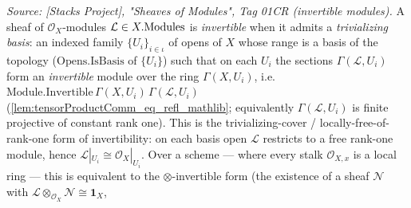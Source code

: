 \begin{definition}

  \label{def:isInvertible}
  \textit{Source: [Stacks Project], "Sheaves of Modules", Tag 01CR (invertible
  modules).}
  A sheaf of \(\mathcal{O}_X\)-modules \(\mathcal{L} \in X.\mathrm{Modules}\) is
  \emph{invertible} when it admits a \emph{trivializing basis}: an indexed family
  \(\{U_i\}_{i \in \iota}\) of opens of \(X\) whose range is a basis of the
  topology (\(\mathrm{Opens.IsBasis}\) of \(\{U_i\}\)) such that on each \(U_i\)
  the sections \(\Gamma(\mathcal{L}, U_i)\) form an \emph{invertible} module over
  the ring \(\Gamma(X, U_i)\), i.e.
  \(\mathrm{Module.Invertible}\,\Gamma(X,U_i)\,\Gamma(\mathcal{L},U_i)\)
  (\cref{lem:tensorProductComm_eq_refl_mathlib}; equivalently
  \(\Gamma(\mathcal{L},U_i)\) is finite projective of constant rank one). This is
  the trivializing-cover / locally-free-of-rank-one form of invertibility: on each
  basis open \(\mathcal{L}\) restricts to a free rank-one module, hence
  \(\mathcal{L}|_{U_i} \cong \mathcal{O}_X|_{U_i}\). Over a scheme --- where every
  stalk \(\mathcal{O}_{X,x}\) is a local ring --- this is equivalent to the
  \(\otimes\)-invertible form (the existence of a sheaf \(\mathcal{N}\) with
  \(\mathcal{L} \otimes_{\mathcal{O}_X} \mathcal{N} \cong \mathbf{1}_X\),

\end{definition}
